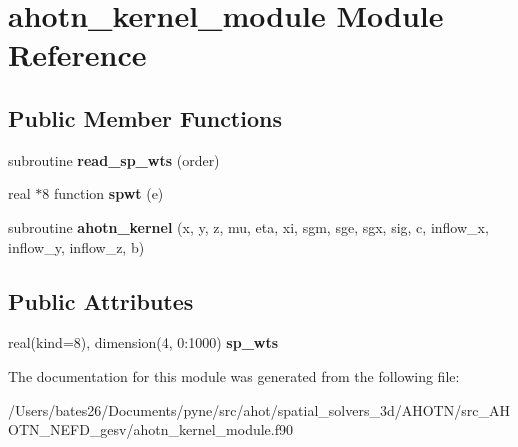 \hypertarget{classahotn__kernel__module}{\section{ahotn\+\_\+kernel\+\_\+module Module Reference}
\label{classahotn__kernel__module}
}
\subsection*{Public Member Functions}
\begin{DoxyCompactItemize}
\item 
\hypertarget{classahotn__kernel__module_a0020d1d5b3a3b3531a8558a277021df7}{subroutine {\bfseries read\+\_\+sp\+\_\+wts} (order)}\label{classahotn__kernel__module_a0020d1d5b3a3b3531a8558a277021df7}

\item 
\hypertarget{classahotn__kernel__module_a39dd68d19fb10ecf5cc99e3a985d9954}{real $\ast$8 function {\bfseries spwt} (e)}\label{classahotn__kernel__module_a39dd68d19fb10ecf5cc99e3a985d9954}

\item 
\hypertarget{classahotn__kernel__module_a63aa1d735806357cca2481808d55aa7a}{subroutine {\bfseries ahotn\+\_\+kernel} (x, y, z, mu, eta, xi, sgm, sge, sgx, sig, c, inflow\+\_\+x, inflow\+\_\+y, inflow\+\_\+z, b)}\label{classahotn__kernel__module_a63aa1d735806357cca2481808d55aa7a}

\end{DoxyCompactItemize}
\subsection*{Public Attributes}
\begin{DoxyCompactItemize}
\item 
\hypertarget{classahotn__kernel__module_abaac07572f901adbba93f9b955fb4e88}{real(kind=8), dimension(4, 0\+:1000) {\bfseries sp\+\_\+wts}}\label{classahotn__kernel__module_abaac07572f901adbba93f9b955fb4e88}

\end{DoxyCompactItemize}


The documentation for this module was generated from the following file\+:\begin{DoxyCompactItemize}
\item 
/\+Users/bates26/\+Documents/pyne/src/ahot/spatial\+\_\+solvers\+\_\+3d/\+A\+H\+O\+T\+N/src\+\_\+\+A\+H\+O\+T\+N\+\_\+\+N\+E\+F\+D\+\_\+gesv/ahotn\+\_\+kernel\+\_\+module.\+f90\end{DoxyCompactItemize}

